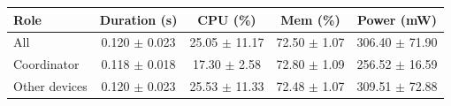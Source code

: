 \begin{tabular}{lcccc}
\hline
\textbf{Role} & \textbf{Duration (s)} & \textbf{CPU (\%)} & \textbf{Mem (\%)} & \textbf{Power (mW)} \\
\hline
All & 0.120 $\pm$ 0.023 & 25.05 $\pm$ 11.17 & 72.50 $\pm$ 1.07 & 306.40 $\pm$ 71.90 \\
Coordinator & 0.118 $\pm$ 0.018 & 17.30 $\pm$ 2.58 & 72.80 $\pm$ 1.09 & 256.52 $\pm$ 16.59 \\
Other devices & 0.120 $\pm$ 0.023 & 25.53 $\pm$ 11.33 & 72.48 $\pm$ 1.07 & 309.51 $\pm$ 72.88 \\
\hline
\end{tabular}
